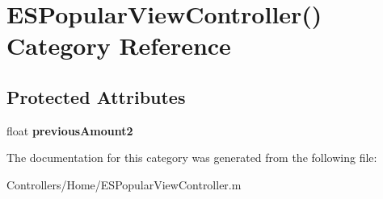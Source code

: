 \hypertarget{category_e_s_popular_view_controller_07_08}{}\section{E\+S\+Popular\+View\+Controller() Category Reference}
\label{category_e_s_popular_view_controller_07_08}
\subsection*{Protected Attributes}
\begin{DoxyCompactItemize}
\item 
\hypertarget{category_e_s_popular_view_controller_07_08_ac45cf8e62cd3b8763e84f9f04484746a}{}float {\bfseries previous\+Amount2}\label{category_e_s_popular_view_controller_07_08_ac45cf8e62cd3b8763e84f9f04484746a}

\end{DoxyCompactItemize}


The documentation for this category was generated from the following file\+:\begin{DoxyCompactItemize}
\item 
Controllers/\+Home/E\+S\+Popular\+View\+Controller.\+m\end{DoxyCompactItemize}
